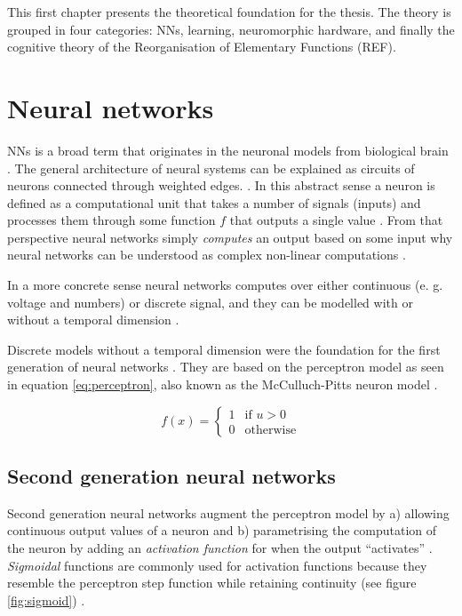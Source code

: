 \documentclass[report.tex]{subfiles}
\begin{document}
This first chapter presents the theoretical foundation for the thesis.
The theory is grouped in four categories: \gls{NN}s, learning,
neuromorphic hardware,  and finally
the cognitive theory of the Reorganisation of Elementary Functions
(\gls{REF}).

\section{Neural networks} \label{sec:nn}
\Gls{NN}s is a broad term that originates in the neuronal models from
biological brain \cite{Dayan2001}.
The general architecture of neural systems can be explained as circuits
of neurons  connected through weighted edges.
\cite{Russel2007, Dayan2001}.
In this abstract sense a neuron is defined as a computational unit that
takes a number of signals (inputs) and processes them through some
function $f$ that outputs a single value \cite{Eliasmith2004}.
From that perspective neural networks simply \textit{computes} an 
output based on some input why neural networks can be understood as
complex non-linear computations \cite{Eliasmith2004, Dayan2001}.

In a more concrete sense neural networks computes over either
continuous (e. g. voltage and numbers) or discrete signal, and they
can be modelled with or without a temporal dimension
\cite{Eliasmith2004, Russel2007, Schmidhuber2014}.

Discrete models without a temporal dimension were the foundation for
the first generation of neural networks \cite{Russel2007, Maass1997}.
They are based on the perceptron model as seen in equation
\ref{eq:perceptron}, also known as the McCulluch-Pitts neuron model
\cite{Eliasmith2004}.

\begin{equation} \label{eq:perceptron}
f(x) = \begin{cases}
	 1 & \text{if } u > 0\\
	 0 & \text{otherwise}
       \end{cases}
\end{equation}

\subsection{Second generation neural networks}
Second generation neural networks augment the perceptron model by
a) allowing continuous output values of a neuron and b) parametrising
the computation of the neuron by adding an \textit{activation function}
 for when the output ``activates'' 
\cite{Maass1997}.
\textit{Sigmoidal} functions are commonly used for activation functions
because they resemble the perceptron step function while 
retaining continuity (see figure \ref{fig:sigmoid})
\cite{Maass1997}.
\end{document}
